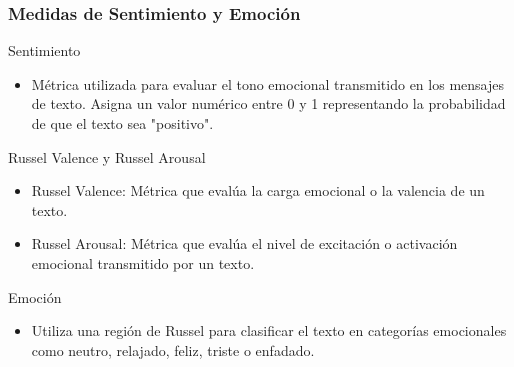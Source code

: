 \documentclass{beamer}
\begin{document}
\begin{frame}
	\frametitle{Medidas de Sentimiento y Emoción}
	\begin{block}{Sentimiento}
		\begin{itemize}
			\item Métrica utilizada para evaluar el tono emocional transmitido en los mensajes de texto. Asigna un valor numérico entre 0 y 1 representando la probabilidad de que el texto sea "positivo".
		\end{itemize}
	\end{block}
	
	\begin{block}{Russel Valence y Russel Arousal}
		\begin{itemize}
			\item Russel Valence: Métrica que evalúa la carga emocional o la valencia de un texto.
			\item Russel Arousal: Métrica que evalúa el nivel de excitación o activación emocional transmitido por un texto.
		\end{itemize}
	\end{block}
	
	\begin{block}{Emoción}
		\begin{itemize}
			\item Utiliza una región de Russel para clasificar el texto en categorías emocionales como neutro, relajado, feliz, triste o enfadado.
		\end{itemize}
	\end{block}
	
\end{frame}
\end{document}
